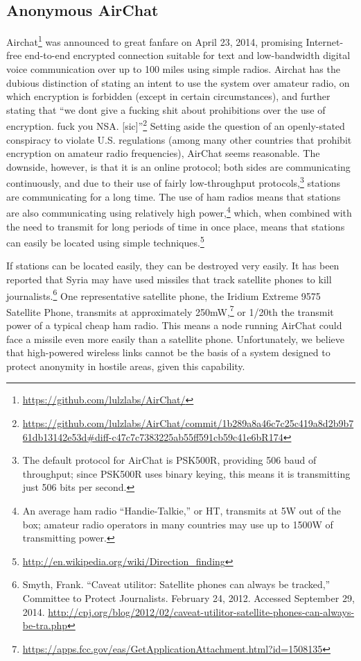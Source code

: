\documentclass[12pt]{article}
\begin{document}
  \subsection{Anonymous AirChat}
  \label{subsec:airchat}
  
  Airchat\footnote{\url{https://github.com/lulzlabs/AirChat/}} was announced to great fanfare on April 23, 2014, promising Internet-free end-to-end encrypted connection suitable for text and low-bandwidth digital voice communication over up to 100 miles using simple radios. Airchat has the dubious distinction of stating an intent to use the system over amateur radio, on which encryption is forbidden (except in certain circumstances), and further stating that ``we dont give a fucking shit about prohibitions over the use of encryption. fuck you NSA. [sic]''\footnote{\url{https://github.com/lulzlabs/AirChat/commit/1b289a8a46c7c25c419a8d2b9b761db13142e53d\#diff-c47c7c7383225ab55ff591cb59c41e6bR174}} Setting aside the question of an openly-stated conspiracy to violate U.S. regulations (among many other countries that prohibit encryption on amateur radio frequencies), AirChat seems reasonable. The downside, however, is that it is an online protocol; both sides are communicating continuously, and due to their use of fairly low-throughput protocols,\footnote{The default protocol for AirChat is PSK500R, providing 506 baud of throughput; since PSK500R uses binary keying, this means it is transmitting just 506 bits per second.} stations are communicating for a long time. The use of ham radios means that stations are also communicating using relatively high power,\footnote{An average ham radio ``Handie-Talkie,'' or HT, transmits at 5W out of the box; amateur radio operators in many countries may use up to 1500W of transmitting power.} which, when combined with the need to transmit for long periods of time in once place, means that stations can easily be located using simple techniques.\footnote{\url{http://en.wikipedia.org/wiki/Direction_finding}}
  
  If stations can be located easily, they can be destroyed very easily. It has been reported that Syria may have used missiles that track satellite phones to kill journalists.\footnote{Smyth, Frank. ``Caveat utilitor: Satellite phones can always be tracked,'' Committee to Protect Journalists. February 24, 2012. Accessed September 29, 2014. \url{http://cpj.org/blog/2012/02/caveat-utilitor-satellite-phones-can-always-be-tra.php}} One representative satellite phone, the Iridium Extreme 9575 Satellite Phone, transmits at approximately 250mW,\footnote{\url{https://apps.fcc.gov/eas/GetApplicationAttachment.html?id=1508135}} or 1/20th the transmit power of a typical cheap ham radio. This means a node running AirChat could face a missile even more easily than a satellite phone. Unfortunately, we believe that high-powered wireless links cannot be the basis of a system designed to protect anonymity in hostile areas, given this capability.
  
\end{document}
